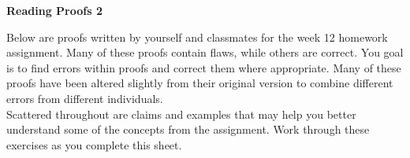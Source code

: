 \documentclass[12 pt]{article}
\theoremstyle{definition}
\theoremstyle{plain}
\theoremstyle{mytheorem}
\theoremstyle{myexample}
\theoremstyle{mydefinition}
\begin{document}
\begin{center}
\textbf{Reading Proofs 2}
\end{center}

Below are proofs written by yourself and classmates for the week 12 homework assignment.  Many of these proofs contain flaws, while others are correct.  You goal is to find errors within proofs and correct them where appropriate.  Many of these proofs have been altered slightly from their original version to combine different errors from different individuals.\\

Scattered throughout are claims and examples that may help you better understand some of the concepts from the assignment.  Work through these exercises as you complete this sheet.
\end{document}
